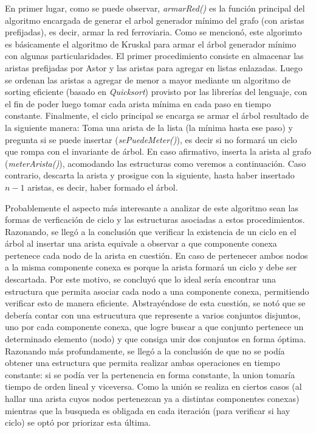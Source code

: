 \documentclass[a4paper,11pt] {article}
\begin{document}
En primer lugar, como se puede observar, \textit{armarRed()} es la función principal del algoritmo encargada de generar el arbol generador mínimo del grafo (con aristas prefijadas), es decir, armar la red ferroviaria. Como se mencionó, este algorimto es básicamente el algoritmo de Kruskal para armar el árbol generador mínimo con algunas particularidades. El primer procedimiento consiste en almacenar las aristas prefijadas por Astor y las aristas para agregar en listas enlazadas. Luego se ordenan las aristas a agregar de menor a mayor mediante un algoritmo de sorting eficiente (basado en \textit{Quicksort}) provisto por las librerías del lenguaje, con el fin de poder luego tomar cada arista mínima en cada paso en tiempo constante. Finalmente, el ciclo principal se encarga se armar el árbol resultado de la siguiente manera: Toma una arista de la lista (la mínima hasta ese paso) y pregunta si se puede insertar (\textit{sePuedeMeter()}), es decir si no formará un ciclo que rompa con el invariante de árbol. En caso afirmativo, inserta la arista al grafo (\textit{meterArista()}), acomodando las estructuras como veremos a continuación. Caso contrario, descarta la arista y prosigue con la siguiente, hasta haber insertado $n-1$ aristas, es decir, haber formado el árbol.

Probablemente el aspecto más interesante a analizar de este algoritmo sean las formas de verficación de ciclo y las estructuras asociadas a estos procedimientos. Razonando, se llegó a la conclusión que verificar la existencia de un ciclo en el árbol al insertar una arista equivale a observar a que componente conexa pertenece cada nodo de la arista en cuestión. En caso de pertenecer ambos nodos a la misma componente conexa es porque la arista formará un ciclo y debe ser descartada. Por este motivo, se concluyó que lo ideal sería encontrar una estructura que permita asociar cada nodo a una componente conexa, permitiendo verificar esto de manera eficiente. Abstrayéndose de esta cuestión, se notó que se debería contar con una estrucutura que represente a varios conjuntos disjuntos, uno por cada componente conexa, que logre buscar a que conjunto pertenece un determinado elemento (nodo) y que consiga unir dos conjuntos en forma óptima. Razonando más profundamente, se llegó a la conclusión de que no se podía obtener una estructura que permita realizar ambas operaciones en tiempo constante: si se podía ver la pertenencia en forma constante, la union tomaría tiempo de orden lineal y viceversa. Como la unión se realiza en ciertos casos (al hallar una arista cuyos nodos pertenezcan ya a distintas componentes conexas) mientras que la busqueda es obligada en cada iteración (para verificar si hay ciclo) se optó por priorizar esta última.
\end{document}
